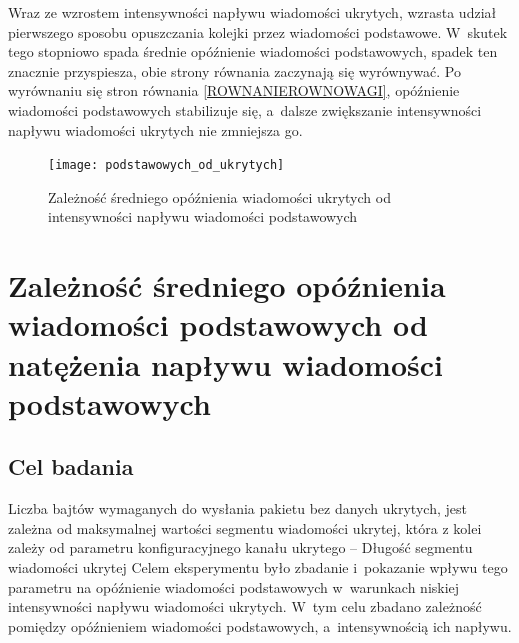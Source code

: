 \documentclass[a4paper, twoside, 12pt]{report}
\begin{document}
            Wraz ze wzrostem intensywności napływu wiadomości ukrytych, wzrasta udział
            pierwszego sposobu opuszczania kolejki przez wiadomości podstawowe.
            W~skutek tego stopniowo spada średnie opóźnienie wiadomości podstawowych,
            spadek ten znacznie przyspiesza, obie strony równania zaczynają się wyrównywać.
            Po wyrównaniu się stron równania \ref{ROWNANIEROWNOWAGI},
            opóźnienie wiadomości podstawowych stabilizuje się, a~dalsze zwiększanie
            intensywności napływu wiadomości ukrytych nie zmniejsza go.

        \begin{figure}[h]
                \centering
                \texttt{[image: podstawowych\_od\_ukrytych]}
                \caption{Zależność średniego opóźnienia wiadomości ukrytych od
                    intensywności napływu wiadomości podstawowych}
                \label{OPOZNIENIEPODSTAWOWYCHODUKRYTYCH}
        \end{figure}



    \section{Zależność średniego opóźnienia wiadomości podstawowych od natężenia napływu wiadomości podstawowych} \label{BADANIEDLUGOSCISEGMENTUDANYCHUKRYTYCH}
        \subsection{Cel badania}
            Liczba bajtów wymaganych do wysłania pakietu bez danych ukrytych,
            jest zależna od maksymalnej wartości segmentu wiadomości ukrytej, która
            z kolei zależy od parametru konfiguracyjnego kanału ukrytego -- Długość segmentu wiadomości ukrytej
            Celem eksperymentu było zbadanie i~pokazanie wpływu tego parametru
            na opóźnienie wiadomości podstawowych w~warunkach niskiej intensywności
            napływu wiadomości ukrytych. W~tym celu zbadano zależność pomiędzy
            opóźnieniem wiadomości podstawowych, a~intensywnością ich napływu.
\end{document}
